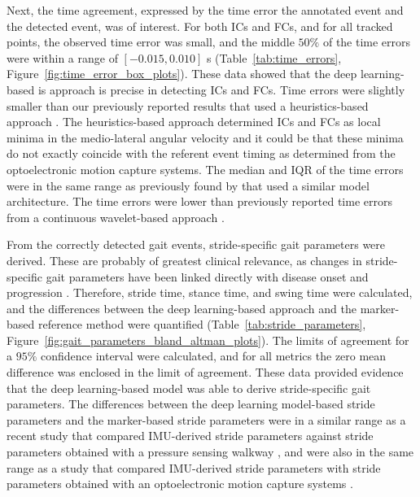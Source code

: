 \documentclass[sensors,article,submit,pdftex,moreauthors]{Definitions/mdpi}
\begin{document}
Next, the time agreement, expressed by the time error the annotated event and the detected event, was of interest. For both ICs and FCs, and for all tracked points, the observed time error was small, and the middle $50\%$ of the time errors were within a range of $\left[-0.015,0.010\right]$ s (Table~\ref{tab:time_errors}, Figure~\ref{fig:time_error_box_plots}). These data showed that the deep learning-based is approach is precise in detecting ICs and FCs. Time errors were slightly smaller than our previously reported results \cite{Romijnders2021} that used a heuristics-based approach \cite{Salarian2004}. The heuristics-based approach determined ICs and FCs as local minima in the medio-lateral angular velocity \cite{Salarian2004} and it could be that these minima do not exactly coincide with the referent event timing as determined from the optoelectronic motion capture systems. The median and IQR of the time errors were in the same range as previously found by \cite{Gadaleta2019} that used a similar model architecture. The time errors were lower than previously reported time errors from a continuous wavelet-based approach \cite{Ji2019}.

From the correctly detected gait events, stride-specific gait parameters were derived. These are probably of greatest clinical relevance, as changes in stride-specific gait parameters have been linked directly with disease onset and progression \cite{DelDin2019,Koenig2017,Bertoli2018,SchroederVon1995,Mohan2021,Griskevicius2016,Flachenecker2019}. Therefore, stride time, stance time, and swing time were calculated, and the differences between the deep learning-based approach and the marker-based reference method were quantified (Table~\ref{tab:stride_parameters}, Figure~\ref{fig:gait_parameters_bland_altman_plots}). The limits of agreement for a $95\%$ confidence interval were calculated, and for all metrics the zero mean difference was enclosed in the limit of agreement. These data provided evidence that the deep learning-based model was able to derive stride-specific gait parameters. The differences between the deep learning model-based stride parameters and the marker-based stride parameters were in a similar range as a recent study that compared IMU-derived stride parameters against stride parameters obtained with a pressure sensing walkway \cite{Gadaleta2019,Niswander2021}, and were also in the same range as a study that compared IMU-derived stride parameters with stride parameters obtained with an optoelectronic motion capture systems \cite{Carcreff2018}.
\end{document}
